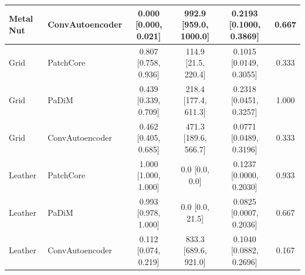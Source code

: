 \begin{table}[t]
{\begin{tabular}{llcccc}
Metal Nut & ConvAutoencoder & 0.000 [0.000, 0.021] & 992.9 [959.0, 1000.0] & 0.2193 [0.1000, 0.3869] & 0.667 \\
\midrule
Grid & PatchCore & 0.807 [0.758, 0.936] & 114.9 [21.5, 220.4] & 0.1015 [0.0149, 0.3055] & 0.333 \\
Grid & PaDiM & 0.439 [0.339, 0.709] & 218.4 [177.4, 611.3] & 0.2318 [0.0451, 0.3257] & 1.000 \\
Grid & ConvAutoencoder & 0.462 [0.405, 0.685] & 471.3 [189.6, 566.7] & 0.0771 [0.0489, 0.3196] & 0.333 \\
\midrule
Leather & PatchCore & 1.000 [1.000, 1.000] & 0.0 [0.0, 0.0] & 0.1237 [0.0000, 0.2030] & 0.933 \\
Leather & PaDiM & 0.993 [0.978, 1.000] & 0.0 [0.0, 21.5] & 0.0825 [0.0007, 0.2036] & 0.667 \\
Leather & ConvAutoencoder & 0.112 [0.074, 0.219] & 833.3 [689.6, 921.0] & 0.1040 [0.0882, 0.2696] & 0.167 \\
\bottomrule
\end{tabular}}
\end{table}
